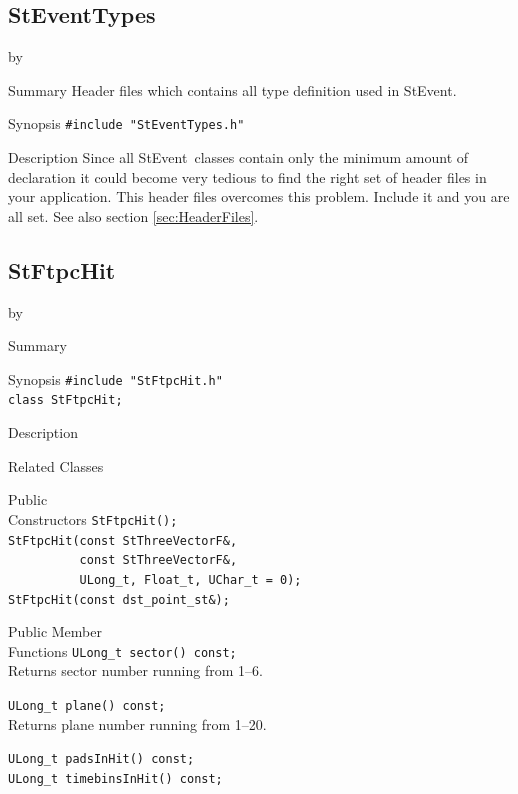 \documentclass[twoside]{article}
\newcommand{\StEvent}{\textsf{StEvent}}
\newcommand{\entrylabel}[1]{\mbox{\textbf{{#1}}}\hfil}%
\newenvironment{entry}
{\begin{list}{}%
    {\renewcommand{\makelabel}{\entrylabel}%
     \setlength{\labelwidth}{90pt}%
     \setlength{\leftmargin}{\labelwidth}
     \advance\leftmargin by \labelsep%
      }%
    }%
  {\end{list}}
\newcommand{\Entrylabel}[1]%
{\raisebox{0pt}[1ex][0pt]{\makebox[\labelwidth][l]%
    {\parbox[t]{\labelwidth}{\hspace{0pt}\textbf{{#1}}}}}}
\newenvironment{Entry}%
{\renewcommand{\entrylabel}{\Entrylabel}\begin{entry}}%
  {\end{entry}}
\begin{document}
\subsection{StEventTypes}
\label{sec:StEventTypes}
\begin{Entry}
\item[Summary] Header files which contains all type definition used in
    \StEvent.
\item[Synopsis]
    \verb+#include "StEventTypes.h"+\\
\item[Description] Since all \StEvent\ classes contain only the
    minimum amount of declaration it could become very tedious to find
    the right set of header files in your application.  This header
    files overcomes this problem. Include it and you are all set.  See
    also section \ref{sec:HeaderFiles}.
\end{Entry}
\clearpage


\subsection{StFtpcHit}
\label{sec:StFtpcHit}
\begin{Entry}
\item[Summary]
\item[Synopsis]
    \verb+#include "StFtpcHit.h"+\\
    \verb+class StFtpcHit;+\\
\item[Description]
\item[Related Classes]
\item[Public\\ Constructors]
    \verb+StFtpcHit();+\\

    \verb+StFtpcHit(const StThreeVectorF&,+\\
    \verb+          const StThreeVectorF&,+\\
    \verb+          ULong_t, Float_t, UChar_t = 0);+\\

    \verb+StFtpcHit(const dst_point_st&);+\\
\item[Public Member\\ Functions]
    \verb+ULong_t sector() const;+\\
    Returns sector number running from 1--6.
    
    \verb+ULong_t plane() const;+\\
    Returns plane number running from 1--20.      

    \verb+ULong_t padsInHit() const;+\\
    \verb+ULong_t timebinsInHit() const;+\\
\end{Entry}
\clearpage
\end{document}

